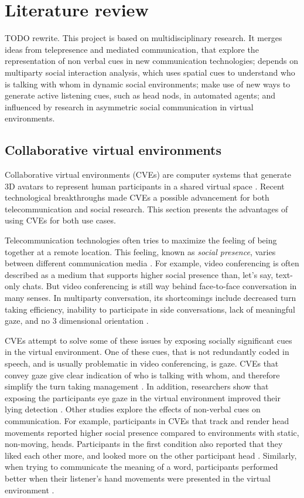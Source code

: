 \documentclass[]{simple-thesis}
\begin{document}
\chapter{Literature review}\label{literature_review}

TODO rewrite.
This project is based on multidisciplinary research.
It merges ideas from telepresence and mediated communication, that explore the representation of non verbal cues in new communication technologies;
depends on multiparty social interaction analysis, which uses spatial cues to understand who is talking with whom in dynamic social environments;
make use of new ways to generate active listening cues, such as head nods, in automated agents;
and influenced by research in asymmetric social communication in virtual environments.

\section{Collaborative virtual environments}

Collaborative virtual environments (CVEs) are computer systems that generate 3D avatars to represent human participants in a shared virtual space \citep{Bailenson2004}.
Recent technological breakthroughs made CVEs a possible advancement for both telecommunication and social research.
This section presents the advantages of using CVEs for both use cases.

Telecommunication technologies often tries to maximize the feeling of being together at a remote location.
This feeling, known as \textit{social presence}, varies between different communication media \citep{Short1976}.
For example, video conferencing is often described as a medium that supports higher social presence than, let's say, text-only chats.
But video conferencing is still way behind face-to-face conversation in many senses.
In multiparty conversation, its shortcomings include decreased turn taking efficiency, inability to participate in side conversations, lack of meaningful gaze, and no 3 dimensional orientation \citep{Isaacs1994}.

CVEs attempt to solve some of these issues by exposing socially significant cues in the virtual environment.
One of these cues, that is not redundantly coded in speech, and is usually problematic in video conferencing, is gaze.
CVEs that convey gaze give clear indication of who is talking with whom, and therefore simplify the turn taking management \citep{Vertegaal1999, Vertegaal2003}.
In addition, researchers show that exposing the participants eye gaze in the virtual environment improved their lying detection \citep{Steptoe2010}.
Other studies explore the effects of non-verbal cues on communication.
For example, participants in CVEs that track and render head movements reported higher social presence compared to environments with static, non-moving, heads.
Participants in the first condition also reported that they liked each other more, and looked more on the other participant head \citep{Bailenson2002}.
Similarly, when trying to communicate the meaning of a word, participants performed better when their listener's hand movements were presented in the virtual environment \citep{Dodds2011}.
\end{document}
